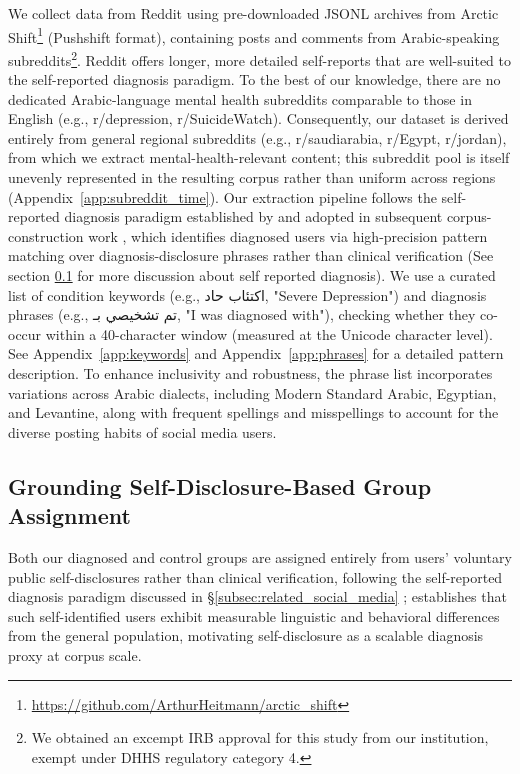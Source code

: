 \documentclass[11pt]{article}
\begin{document}
We collect data from Reddit using pre-downloaded JSONL archives from Arctic Shift\footnote{\url{https://github.com/ArthurHeitmann/arctic_shift}} (Pushshift format), containing posts and comments from Arabic-speaking subreddits\footnote{We obtained an excempt IRB approval for this study from our institution, exempt under DHHS regulatory category 4. }. Reddit offers longer, more detailed self-reports that are well-suited to the self-reported diagnosis paradigm. To the best of our knowledge, there are no dedicated Arabic-language mental health subreddits comparable to those in English (e.g., r/depression, r/SuicideWatch). Consequently, our dataset is derived entirely from general regional subreddits (e.g., r/saudiarabia, r/Egypt, r/jordan), from which we extract mental-health-relevant content; this subreddit pool is itself unevenly represented in the resulting corpus rather than uniform across regions (Appendix~\ref{app:subreddit_time}).
Our extraction pipeline follows the self-reported diagnosis paradigm established by \citet{coppersmith2014quantifying} and adopted in subsequent corpus-construction work \citep{coppersmith2015clpsych, cohan-etal-2018-smhd}, which identifies diagnosed users via high-precision pattern matching over diagnosis-disclosure phrases rather than clinical verification (See section \ref{subsec:self_disclosure_grounding} for more discussion about self reported diagnosis).
We use a curated list of condition keywords (e.g., \foreignlanguage{arabic}{اكتئاب حاد}, "Severe Depression") and diagnosis phrases (e.g., \foreignlanguage{arabic}{تم تشخيصي بـ}, "I was diagnosed with"), checking whether they co-occur within a 40-character window (measured at the Unicode character level). See Appendix~\ref{app:keywords} and Appendix~\ref{app:phrases} for a detailed pattern description. To enhance inclusivity and robustness, the phrase list incorporates variations across Arabic dialects, including Modern Standard Arabic, Egyptian, and Levantine, along with frequent spellings and misspellings to account for the diverse posting habits of social media users. 


\subsection{Grounding Self-Disclosure-Based Group Assignment}
\label{subsec:self_disclosure_grounding}

Both our diagnosed and control groups are assigned entirely from users'
voluntary public self-disclosures rather than clinical verification,
following the self-reported diagnosis paradigm discussed in
\S\ref{subsec:related_social_media} \citep{coppersmith2014quantifying,
coppersmith2015clpsych, cohan-etal-2018-smhd}; \citet{de2013predicting}
establishes that such self-identified users exhibit measurable
linguistic and behavioral differences from the general population,
motivating self-disclosure as a scalable diagnosis proxy at corpus
scale.
\end{document}
